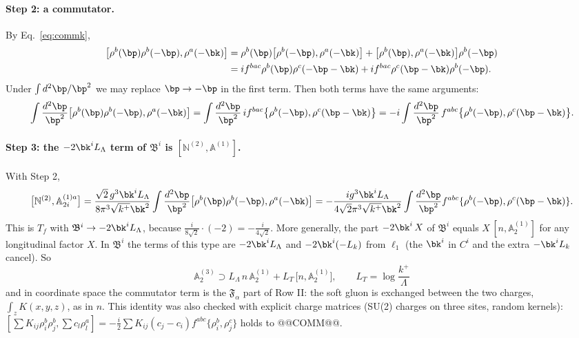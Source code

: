\paragraph{Step 2: a commutator.} By Eq.~\eqref{eq:commk},
\begin{align}
\big[\rho^b(\bp)\rho^b(-\bp),\rho^a(-\bk)\big]&=\rho^b(\bp)\big[\rho^b(-\bp),\rho^a(-\bk)\big]+\big[\rho^b(\bp),\rho^a(-\bk)\big]\rho^b(-\bp)\notag\\
&=if^{bac}\rho^b(\bp)\rho^c(-\bp-\bk)+if^{bac}\rho^c(\bp-\bk)\rho^b(-\bp).
\end{align}
Under $\int d^2\bp/\bp^2$ we may replace $\bp\to-\bp$ in the first term. Then both terms have the same arguments:
\begin{equation}
\int\frac{d^2\bp}{\bp^2}\big[\rho^b(\bp)\rho^b(-\bp),\rho^a(-\bk)\big]=\int\frac{d^2\bp}{\bp^2}\,if^{bac}\big\{\rho^b(-\bp),\rho^c(\bp-\bk)\big\}=-i\int\frac{d^2\bp}{\bp^2}\,f^{abc}\big\{\rho^b(-\bp),\rho^c(\bp-\bk)\big\}.
\end{equation}
\paragraph{Step 3: the $-2\bk^iL_\Lambda$ term of $\mathfrak B^i$ is $[\mathbb N^{(2)},\mathbb A^{(1)}]$.} With Step 2,
\begin{equation}
\big[\mathbb N^{(2)},\mathbb A^{(1)a}_{2i}\big]=\frac{\sqrt2\,g^3\bk^iL_\Lambda}{8\pi^3\sqrt{k^+}\bk^2}\int\frac{d^2\bp}{\bp^2}\big[\rho^b(\bp)\rho^b(-\bp),\rho^a(-\bk)\big]
=-\frac{ig^3\bk^iL_\Lambda}{4\sqrt2\pi^3\sqrt{k^+}\bk^2}\int\frac{d^2\bp}{\bp^2}f^{abc}\{\rho^b(-\bp),\rho^c(\bp-\bk)\}.
\end{equation}
This is $T_f$ with $\mathfrak B^i\to-2\bk^iL_\Lambda$, because $\frac{i}{8\sqrt2}\cdot(-2)=-\frac{i}{4\sqrt2}$. More generally, the part $-2\bk^i\,X$ of $\mathfrak B^i$ equals $X\,[n,\mathbb A^{(1)}_2]$ for any longitudinal factor $X$. In $\mathfrak B^i$ the terms of this type are $-2\bk^iL_\Lambda$ and $-2\bk^i(-L_k)$ from $\ell_1$ (the $\bk^i$ in $C^i$ and the extra $-\bk^iL_k$ cancel). So
\begin{equation}
\boxed{\;\mathbb A^{(3)}_2\supset L_\Lambda\,n\,\mathbb A^{(1)}_2+L_T\,\big[n,\mathbb A^{(1)}_2\big],\qquad L_T=\log\frac{k^+}{\Lambda}\;}
\label{eq:Awritten}
\end{equation}
and in coordinate space the commutator term is the $\mathfrak F_\alpha$ part of Row II: the soft gluon is exchanged between the two charges, $\int_zK(x,y,z)$, as in $n$. This identity was also checked with explicit charge matrices (SU(2) charges on three sites, random kernels): $[\sum K_{ij}\rho^b_i\rho^b_j,\sum c_l\rho^a_l]=-\frac i2\sum K_{ij}(c_j-c_i)f^{abc}\{\rho^b_i,\rho^c_j\}$ holds to @@COMM@@.

